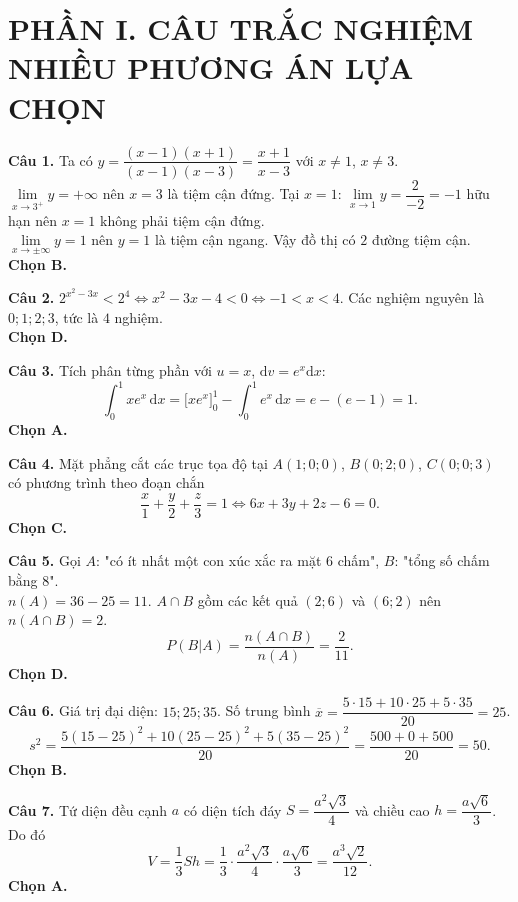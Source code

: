\documentclass[12pt,a4paper]{article}
\begin{document}
\section*{\large PHẦN I. CÂU TRẮC NGHIỆM NHIỀU PHƯƠNG ÁN LỰA CHỌN}

\noindent\textbf{Câu 1.} Ta có $y = \dfrac{(x - 1)(x + 1)}{(x - 1)(x - 3)} = \dfrac{x + 1}{x - 3}$ với $x \ne 1$, $x \ne 3$.\\
$\lim\limits_{x \to 3^+} y = +\infty$ nên $x = 3$ là tiệm cận đứng. Tại $x = 1$: $\lim\limits_{x \to 1} y = \dfrac{2}{-2} = -1$ hữu hạn nên $x = 1$ không phải tiệm cận đứng.\\
$\lim\limits_{x \to \pm\infty} y = 1$ nên $y = 1$ là tiệm cận ngang. Vậy đồ thị có $2$ đường tiệm cận.\\
\textbf{Chọn B.}

\vspace{0.25cm}
\noindent\textbf{Câu 2.} $2^{x^2 - 3x} < 2^4 \iff x^2 - 3x - 4 < 0 \iff -1 < x < 4$. Các nghiệm nguyên là $0; 1; 2; 3$, tức là $4$ nghiệm.\\
\textbf{Chọn D.}

\vspace{0.25cm}
\noindent\textbf{Câu 3.} Tích phân từng phần với $u = x$, $\mathrm{d}v = e^x\mathrm{d}x$:
\[
\int_0^1 x e^x\,\mathrm{d}x = \Big[x e^x\Big]_0^1 - \int_0^1 e^x\,\mathrm{d}x = e - (e - 1) = 1.
\]
\textbf{Chọn A.}

\vspace{0.25cm}
\noindent\textbf{Câu 4.} Mặt phẳng cắt các trục tọa độ tại $A(1; 0; 0)$, $B(0; 2; 0)$, $C(0; 0; 3)$ có phương trình theo đoạn chắn
\[
\dfrac{x}{1} + \dfrac{y}{2} + \dfrac{z}{3} = 1 \iff 6x + 3y + 2z - 6 = 0.
\]
\textbf{Chọn C.}

\vspace{0.25cm}
\noindent\textbf{Câu 5.} Gọi $A$: "có ít nhất một con xúc xắc ra mặt $6$ chấm", $B$: "tổng số chấm bằng $8$".\\
$n(A) = 36 - 25 = 11$. $A \cap B$ gồm các kết quả $(2; 6)$ và $(6; 2)$ nên $n(A \cap B) = 2$.
\[
P(B|A) = \dfrac{n(A \cap B)}{n(A)} = \dfrac{2}{11}.
\]
\textbf{Chọn D.}

\vspace{0.25cm}
\noindent\textbf{Câu 6.} Giá trị đại diện: $15; 25; 35$. Số trung bình $\overline{x} = \dfrac{5\cdot 15 + 10\cdot 25 + 5\cdot 35}{20} = 25$.
\[
s^2 = \dfrac{5(15 - 25)^2 + 10(25 - 25)^2 + 5(35 - 25)^2}{20} = \dfrac{500 + 0 + 500}{20} = 50.
\]
\textbf{Chọn B.}

\vspace{0.25cm}
\noindent\textbf{Câu 7.} Tứ diện đều cạnh $a$ có diện tích đáy $S = \dfrac{a^2\sqrt{3}}{4}$ và chiều cao $h = \dfrac{a\sqrt{6}}{3}$. Do đó
\[
V = \dfrac{1}{3}Sh = \dfrac{1}{3}\cdot\dfrac{a^2\sqrt{3}}{4}\cdot\dfrac{a\sqrt{6}}{3} = \dfrac{a^3\sqrt{2}}{12}.
\]
\textbf{Chọn A.}
\end{document}
